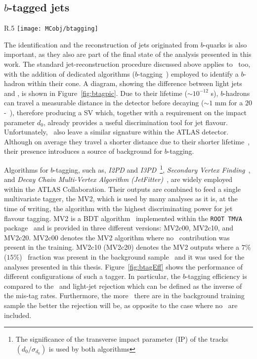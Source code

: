 		\subsection*{$b$-tagged jets}

			\begin{wrapfigure}{R}{.5\textwidth}
				\centering
				\texttt{[image: MCobj/btagging]}
				\caption{\label{fig:btagpic} Diagram showing the common principle of identification of jets initiated by $b$-quark decays~\cite{btagpic}.}
			\end{wrapfigure}

			The identification and the reconstruction of jets originated from $b$-quarks is also important, as they also are part of the final state of the analysis presented in this work. The standard jet-reconstruction procedure discussed above applies to \bjs\, too, with the addition of dedicated algorithms ($b$-tagging~\cite{Aad:2015ydr}) employed to identify a $b$-hadron within their cone. A diagram, showing the difference between light jets and \bjs, is shown in Figure~\ref{fig:btagpic}. Due to their lifetime ($\sim 10^{-12}$ s), $b$-hadrons can travel a measurable distance in the detector before decaying ($\sim 1$ mm for a $20$-\GeV\ \bj), therefore producing a \ac{SV} which, together with a requirement on the impact parameter $d_0$, already provides a useful discrimination tool for jet flavour. Unfortunately, \cjs\ also leave a similar signature within the \ac{ATLAS} detector. Although on average they travel a shorter distance due to their shorter lifetime~\cite{ATL-PHYS-PUB-2015-001}, their presence introduces a source of background for $b$-tagging. 

			Algorithms for $b$-tagging, such as, \emph{I2PD} and \emph{I3PD}~\cite{Lehmacher:1128662}\footnote{The significance of the transverse impact parameter (IP) of the tracks $\left ( d_0/\sigma_{d_0} \right )$ is used by both algorithms}, \emph{Secondary Vertex Finding}~\cite{ATL-PHYS-PUB-2017-011}, and \emph{Decay Chain Multi-Vertex Algorithm (JetFitter)}~\cite{1742-6596-119-3-032032}, are widely employed within the \ac{ATLAS} Collaboration. Their outputs are combined to feed a single multivariate tagger, the \ac{MV2}, which is used by many analyses as it is, at the time of writing, the algorithm with the highest discriminating power for jet flavour tagging. \ac{MV2} is a \ac{BDT} algorithm~\cite{BDT} implemented within the \texttt{ROOT TMVA} package~\cite{Brun:1997pa, 2007physics3039H} and is provided in three different versions: MV2c00, MV2c10, and MV2c20. MV2c00 denotes the MV2 algorithm where no \cj\ contribution was present in the training. MV2c10 (MV2c20) denotes the MV2 outputs where a $7\%$ ($15\%$) \cj\ fraction was present in the background sample~\cite{Aad:2015ydr} and it was used for the analyses presented in this thesis. Figure~\ref{fig:btagEff} shows the performance of different configurations of such a tagger. In particular, the $b$-tagging efficiency is compared to the \cjs\ and light-jet rejection which can be defined as the inverse of the mis-tag rates. Furthermore, the more \cjs\ there are in the background training sample the better the rejection will be, as opposite to the case where no \cjs\ are included. 


